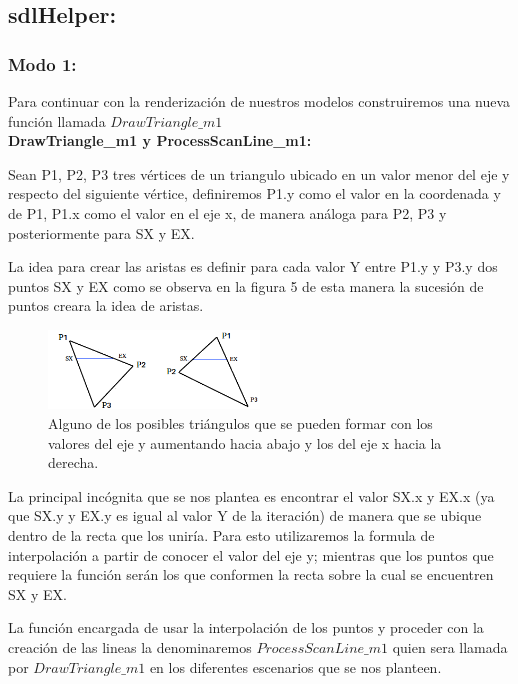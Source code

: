 \documentclass[a4paper]{article}
\begin{document}
\subsection{sdlHelper: }
\subsubsection{Modo 1:} \label{sdlmodo1}


Para continuar con la renderización de nuestros modelos construiremos una nueva función llamada $DrawTriangle\_m1$ \\


\textbf{DrawTriangle\_m1 y ProcessScanLine\_m1:}
\par Sean  P1, P2, P3 tres vértices de un triangulo ubicado en un valor menor del eje y respecto del siguiente vértice, definiremos P1.y como el valor en la coordenada y de P1, P1.x como el valor en el eje x, de manera análoga para P2, P3 y posteriormente para SX y EX. 
\par La idea para crear las aristas es definir para cada valor Y entre P1.y y P3.y dos puntos SX y EX como se observa en la figura 5 de esta manera la sucesión de puntos creara la idea de aristas.
\begin{figure}[h]
    \centering
    \includegraphics[width=0.50\textwidth]{Imagenes/e.png}
    \caption{Alguno de los posibles triángulos que se pueden formar con los valores del eje y aumentando hacia abajo y los del eje x hacia la derecha.}
    \label{fig:mesh1}
\end{figure}
\par La principal incógnita que se nos plantea es encontrar el valor SX.x y EX.x (ya que SX.y y EX.y es igual al valor Y de la iteración) de manera que se ubique dentro de la recta que los uniría. Para esto utilizaremos la formula de interpolación a partir de conocer el valor del eje y; mientras que los puntos que requiere la función serán los que conformen la recta sobre la cual se encuentren SX y EX.
\par La función encargada de usar la interpolación de los puntos y proceder con la creación de las lineas la denominaremos $ProcessScanLine\_m1$ quien sera llamada por $DrawTriangle\_m1$ en los diferentes escenarios que se nos planteen. 
\end{document}
